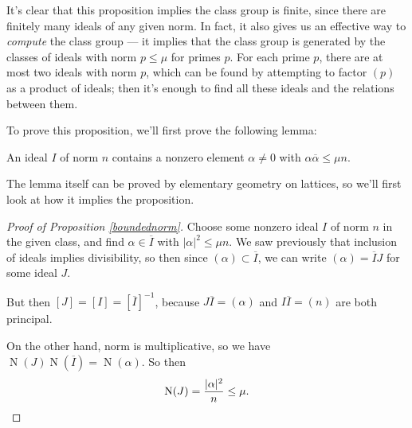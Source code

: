 It's clear that this proposition implies the class group is finite, since there are finitely many ideals of any given norm. In fact, it also gives us an effective way to \emph{compute} the class group --- it implies that the class group is generated by the classes of ideals with norm $p \leq \mu$ for primes $p$. For each prime $p$, there are at most two ideals with norm $p$, which can be found by attempting to factor $(p)$ as a product of ideals; then it's enough to find all these ideals and the relations between them. 

To prove this proposition, we'll first prove the following lemma:

\begin{lemma}\label{geolemma}
    An ideal $I$ of norm $n$ contains a nonzero element $\alpha \neq 0$ with $\alpha\overline{\alpha} \leq \mu n$. 
\end{lemma}

The lemma itself can be proved by elementary geometry on lattices, so we'll first look at how it implies the proposition. 

\begin{proof}[Proof of Proposition \ref{boundednorm}]
Choose some nonzero ideal $I$ of norm $n$ in the given class, and find $\alpha \in \overline{I}$ with $|\alpha|^2 \leq \mu n$. We saw previously that inclusion of ideals implies divisibility, so then since $(\alpha) \subset \overline{I}$, we can write $(\alpha) = \overline{I}J$ for some ideal $J$. 

But then $[J] = [I] = [\overline{I}]^{-1}$, because $J\overline{I} = (\alpha)$ and $I\overline{I} = (n)$ are both principal. 

On the other hand, norm is multiplicative, so we have $\operatorname{N}(J)\operatorname{N}(\overline{I}) = \operatorname{N}(\alpha)$. So then \[\operatorname{N}(J) = \frac{|\alpha|^2}{n} \leq \mu. \qedhere\] 
\end{proof}




